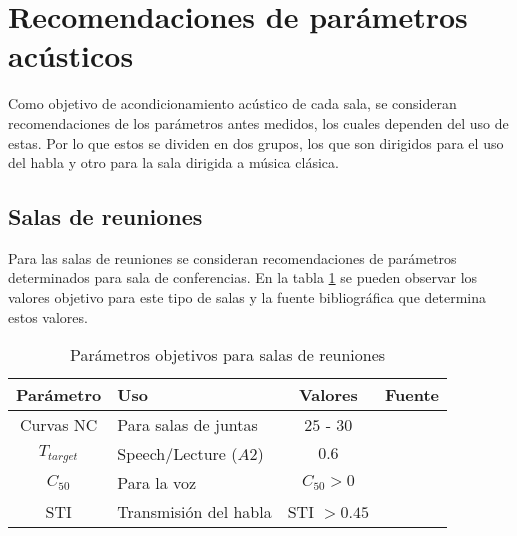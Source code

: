\section{Recomendaciones de parámetros acústicos} \label{secc: Recomendaciones}
Como objetivo de acondicionamiento acústico de cada sala, se consideran recomendaciones de los parámetros antes medidos, los cuales dependen del uso de estas. Por lo que estos se dividen en dos grupos, los que son dirigidos para el uso del habla y otro para la sala dirigida a música clásica.
\subsection{Salas de reuniones}
Para las salas de reuniones se consideran recomendaciones de parámetros determinados para sala de conferencias. En la tabla \ref{tab: parametros objetivos sala de reuniones} se pueden observar los valores objetivo para este tipo de salas y la fuente bibliográfica que determina estos valores.
\begin{table}[H]
    \centering
    \begin{tabular}{|c|l|c|l|}
    \hline
    \textbf{Parámetro} & \textbf{Uso }            & \textbf{Valores}    & \textbf{Fuente}  \\ \hline
    Curvas NC          & Para salas de juntas     & $25$ - $30$         & \cite{Recuero} \\ \hline
    $T_{target}$       & Speech/Lecture ($A2$)      & $0.6$               & \cite{DIN18041} \\ \hline
    $C_{50}$           & Para la voz              &  $C_{50}>0$         & \cite{marshall1994}  \\ \hline  
    STI & Transmisión del habla & STI $>0.45$ & \cite{ISO9921}\\ \hline
    \end{tabular}
    \caption{Parámetros objetivos para salas de reuniones}
    \label{tab: parametros objetivos sala de reuniones}
\end{table}
